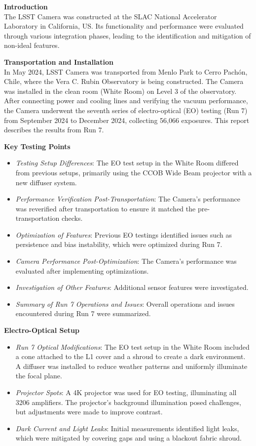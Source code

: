 \textbf{Introduction} \\
The LSST Camera was constructed at the SLAC National Accelerator Laboratory in California, US. Its functionality and performance were evaluated through various integration phases, leading to the identification and mitigation of non-ideal features.

\textbf{Transportation and Installation} \\
In May 2024, LSST Camera was transported from Menlo Park to Cerro Pachón, Chile, where the Vera C. Rubin Observatory is being constructed. The Camera was installed in the clean room (White Room) on Level 3 of the observatory. After connecting power and cooling lines and verifying the vacuum performance, the Camera underwent the seventh series of electro-optical (EO) testing (Run 7) from September 2024 to December 2024, collecting 56,066 exposures. This report describes the results from Run 7.

\textbf{Key Testing Points} \\
\begin{itemize}
    \item \textit{Testing Setup Differences}: The EO test setup in the White Room differed from previous setups, primarily using the CCOB Wide Beam projector with a new diffuser system.
    \item \textit{Performance Verification Post-Transportation}: The Camera's performance was reverified after transportation to ensure it matched the pre-transportation checks.
    \item \textit{Optimization of Features}: Previous EO testings identified issues such as persistence and bias instability, which were optimized during Run 7.
    \item \textit{Camera Performance Post-Optimization}: The Camera's performance was evaluated after implementing optimizations.
    \item \textit{Investigation of Other Features}: Additional sensor features were investigated.
    \item \textit{Summary of Run 7 Operations and Issues}: Overall operations and issues encountered during Run 7 were summarized.
\end{itemize}

\textbf{Electro-Optical Setup} \\
\begin{itemize}
    \item \textit{Run 7 Optical Modifications}: The EO test setup in the White Room included a cone attached to the L1 cover and a shroud to create a dark environment. A diffuser was installed to reduce weather patterns and uniformly illuminate the focal plane.
    \item \textit{Projector Spots}: A 4K projector was used for EO testing, illuminating all 3206 amplifiers. The projector's background illumination posed challenges, but adjustments were made to improve contrast.
    \item \textit{Dark Current and Light Leaks}: Initial measurements identified light leaks, which were mitigated by covering gaps and using a blackout fabric shroud.
\end{itemize}

